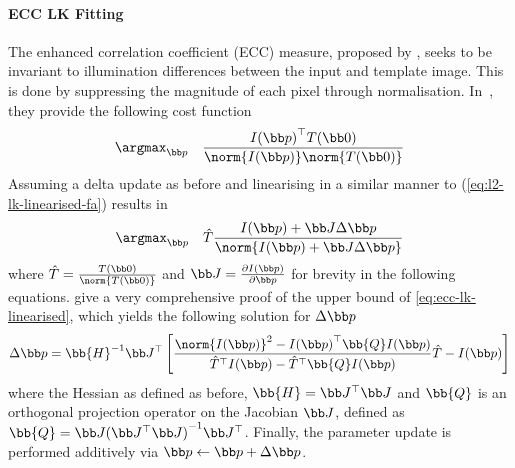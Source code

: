 \paragraph{ECC LK Fitting}\label{subsubsec:lk-ecc}
The enhanced correlation coefficient (ECC) measure, proposed by
\citet{evangelidis2008parametric}, seeks to be invariant to illumination differences
between the input and template image. This is done by suppressing the magnitude
of each pixel through normalisation. In~\cite{evangelidis2008parametric}, they provide the
following cost function
\begin{equation}\label{eq:ecc-lk-max}
   \argmax_{\p} \quad \frac{{I(\p)}^{\top} T(\zero)}{\norm{I(\p)} \norm{T(\zero)}}
\end{equation}
Assuming a delta update as before and linearising in a similar manner to
(\ref{eq:l2-lk-linearised-fa}) results in
\begin{equation}\label{eq:ecc-lk-linearised}
    \argmax_{\p} \quad \hat{T} \frac{I(\p) + \J \Delta \p}{\norm{{I(\p) + \J \Delta \p}}}
\end{equation}
where $\hat{T} = \frac{T(\zero)}{\norm{T(\zero)}}$ and
$\J =\frac{\partial I(\p)}{\partial \p}$ for brevity in the following equations.
\citet{evangelidis2008parametric} give a very comprehensive proof of
the upper bound of \cref{eq:ecc-lk-linearised}, which yields the
following solution for $\Delta \p$
\begin{equation}\label{eq:ecc-lk-gauss-newton-fa}
    \Delta \p = \bb{H}^{-1} \J^{\top} \left[ \frac{\norm{I(\p)}^2 - {I(\p)}^{\top} \bb{Q} I(\p)}{\hat{T}^{\top} I(\p) - \hat{T}^{\top} \bb{Q} I(\p)} \hat{T} - I(\p) \right]
\end{equation}
where the Hessian as defined as before, $\bb{H} = \J^{\top} \J$ and $\bb{Q}$ is
an orthogonal projection operator on the Jacobian $\J$,
defined as $\bb{Q} = \J {(\J^\top \J)}^{-1} \J^\top$. Finally, the
parameter update is performed additively via $\p \leftarrow \p + \Delta \p$.

